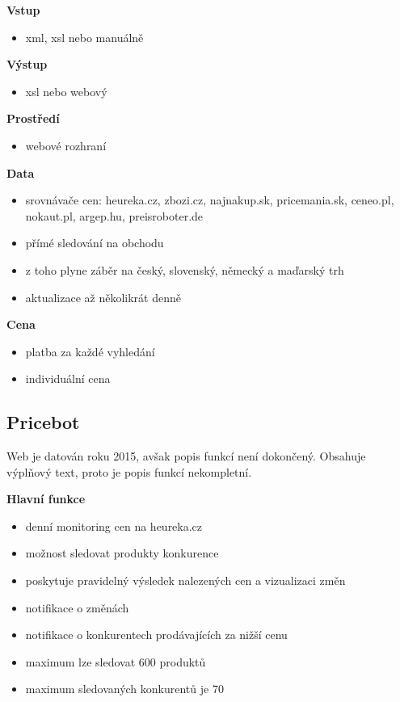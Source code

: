 \documentclass[thesis=B,czech]{FITthesis}[2012/06/26]
\begin{document}
\textbf{Vstup}
\begin{itemize}
\item xml, xsl nebo manuálně
\end{itemize}

\textbf{Výstup}
\begin{itemize}
\item xsl nebo webový
\end{itemize}

\textbf{Prostředí}
\begin{itemize}
\item webové rozhraní
\end{itemize}

\textbf{Data}
\begin{itemize}
\item srovnávače cen: heureka.cz, zbozi.cz, najnakup.sk, pricemania.sk, ceneo.pl, nokaut.pl, argep.hu, preisroboter.de
\item přímé sledování na obchodu
\item z toho plyne záběr na český, slovenský, německý a maďarský trh
\item aktualizace až několikrát denně
\end{itemize}

\textbf{Cena}
\begin{itemize}
\item platba za každé vyhledání
\item individuální cena
\end{itemize}

\subsection{Pricebot \cite{priceBot}}

Web je datován roku 2015, avšak popis funkcí není dokončený. Obsahuje výplňový text, proto je popis funkcí nekompletní.

\textbf{Hlavní funkce}
\begin{itemize}
\item denní monitoring cen na heureka.cz
\item možnost sledovat produkty konkurence
\item poskytuje pravidelný výsledek nalezených cen a vizualizaci změn
\item notifikace o změnách
\item notifikace o konkurentech prodávajících za nižší cenu
\item maximum lze sledovat 600 produktů 
\item maximum sledovaných konkurentů je 70
\end{itemize}
\end{document}

